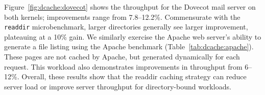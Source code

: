 Figure~\ref{fig:dcache:dovecot} shows the throughput for the 
Dovecot mail server on both kernels; improvements range from 7.8--12.2\%.
Commensurate with the {\tt readdir} microbenchmark, larger directories 
generally see larger improvement, plateauing at a 10\% gain.
We similarly exercise the Apache web server's ability to generate a file listing using the Apache benchmark (Table~\ref{tab:dcache:apache}).
These pages are not cached by Apache, but generated dynamically for each request.
This workload also demonstrates improvements in throughput from 6--12\%.
Overall, these results show that the readdir caching strategy can reduce server load
or improve server throughput for directory-bound workloads.

